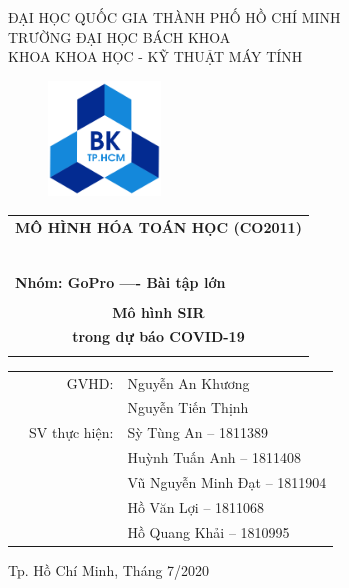 \documentclass[a4paper]{article}
\begin{document}
\begin{titlepage}
\begin{center}
ĐẠI HỌC QUỐC GIA THÀNH PHỐ HỒ CHÍ MINH \\
TRƯỜNG ĐẠI HỌC BÁCH KHOA \\
KHOA KHOA HỌC - KỸ THUẬT MÁY TÍNH 
\end{center}

\vspace{1cm}

\begin{figure}[h!]
\begin{center}
\includegraphics[width=3cm]{Images/hcmut.png}
\end{center}
\end{figure}

\vspace{1cm}


\begin{center}
\begin{tabular}{c}
\multicolumn{1}{l}{\textbf{{\Large MÔ HÌNH HÓA TOÁN HỌC (CO2011)}}}\\
~~\\
\hline
\\
\multicolumn{1}{l}{\textbf{{\Large Nhóm: GoPro ---- Bài tập lớn}}}\\
\\
\textbf{{\Huge Mô hình SIR}} \\
\textbf{{\Huge trong dự báo COVID-19}}\\
\\
\hline
\end{tabular}
\end{center}

\vspace{1.5cm}

\begin{table}[h]
\begin{tabular}{rrl}
\hspace{5 cm} & GVHD: & Nguyễn An Khương\\
\hspace{5 cm} &  & Nguyễn Tiến Thịnh\\

& SV thực hiện: & Sỳ Tùng An -- 1811389 \\
& & Huỳnh Tuấn Anh -- 1811408 \\
& & Vũ Nguyễn Minh Đạt -- 1811904  \\
& & Hồ Văn Lợi -- 1811068\\
& & Hồ Quang Khải -- 1810995 \\
\end{tabular}
\end{table}
\vspace{1.5cm}
\begin{center}
{\footnotesize Tp. Hồ Chí Minh, Tháng 7/2020}
\end{center}
\end{titlepage}
\end{document}
